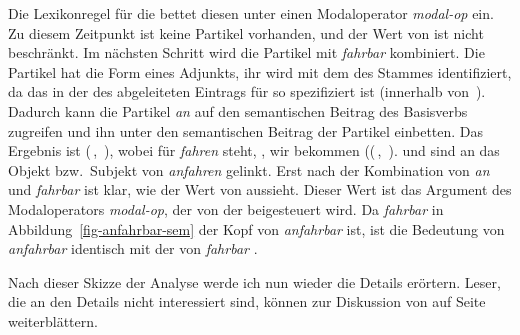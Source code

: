 Die Lexikonregel für die  \bard bettet diesen \contw unter einen Modaloperator \emph{modal-op} ein.
Zu diesem Zeitpunkt ist keine Partikel vorhanden, und der Wert von 
ist nicht beschränkt. Im nächsten Schritt wird die Partikel mit \emph{fahrbar} kombiniert.
Die Partikel hat die Form eines Adjunkts, ihr \modw wird mit dem \synsemw
des Stammes  identifiziert, da das in der \subcatl des abgeleiteten
Eintrags für   so spezifiziert ist (innerhalb von \,).
Dadurch kann die Partikel \emph{an} auf den semantischen Beitrag des Basisverbs  zugreifen
und ihn unter den semantischen Beitrag der Partikel einbetten.
Das Ergebnis ist (\,, \,),
wobei  für \emph{fahren} steht, \dash, wir bekommen ((\,, \,).
 und  sind an das Objekt bzw.\ Subjekt von \emph{anfahren} gelinkt.
%
Erst nach der Kombination von \emph{an} und {\em fahrbar} ist klar, wie der Wert von 
aussieht. Dieser Wert ist das Argument des Modaloperators \emph{modal-op}, der von der \bard beigesteuert wird.
Da \emph{fahrbar} in Abbildung~\ref{fig-anfahrbar-sem} der Kopf von \emph{anfahrbar} ist, ist die Bedeutung von \emph{anfahrbar} identisch
mit der von \emph{fahrbar} .

Nach dieser Skizze der Analyse werde ich nun wieder die Details erörtern.
Leser, die an den Details nicht interessiert sind, können
zur Diskussion von  auf Seite~\pageref{pvs-in-morphology} weiterblättern.

